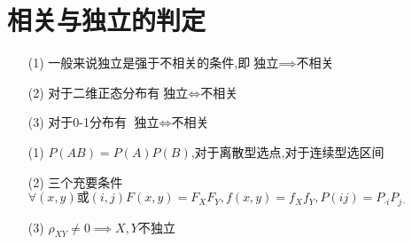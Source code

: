 \documentclass[12pt, a4paper, oneside, UTF8]{ctexbook}
\begin{document}
\section{相关与独立的判定}
\begin{remark}[相关与独立性]
    \begin{enumerate}
    \item[(1)] 一般来说独立是强于不相关的条件,即$\text{独立}\implies\text{不相关}$ 
    \item[(2)] 对于二维正态分布有$\text{独立}\iff\text{不相关}$ 
    \item[(3)] 对于0-1分布有 $\text{独立}\iff\text{不相关}$
    \end{enumerate}
\end{remark}
\begin{remark}[判断是否独立的基本方法]
    \begin{enumerate}
    \item [(1)] $P(AB)=P(A)P(B)$,对于离散型选点,对于连续型选区间 
    \item [(2)] 三个充要条件$\forall (x,y)\text{或}(i,j) F(x,y)=F_XF_Y,f(x,y)=f_Xf_Y,P(ij)=P_{\cdot i}P_{j\cdot}$
    \item [(3)] $\rho_{XY}\neq 0\implies X,Y$不独立
    \end{enumerate}
\end{remark}
\end{document}
